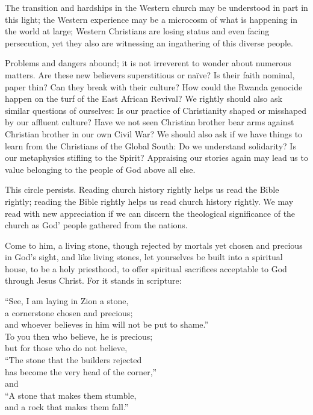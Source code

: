 The transition and hardships in the Western church may be understood in part in this light; the
Western experience may be a microcosm of what is happening in the world at large; Western Christians
are losing status and even facing persecution, yet they also are witnessing an ingathering of this
diverse people.

Problems and dangers abound; it is not irreverent to wonder about numerous matters. Are these new
believers superstitious or naïve? Is their faith nominal, paper thin? Can they break with their
culture? How could the Rwanda genocide happen on the turf of the East African Revival? We rightly
should also ask similar questions of ourselves: Is our practice of Christianity shaped or misshaped
by our affluent culture? Have we not seen Christian brother bear arms against Christian brother in
our own Civil War? We should also ask if we have things to learn from the Christians of the Global
South: Do we understand solidarity? Is our metaphysics stifling to the Spirit? Appraising our
stories again may lead us to value belonging to the people of God above all else.

This circle persists. Reading church history rightly helps us read the Bible rightly; reading the
Bible rightly helps us read church history rightly. We may read with new appreciation if we can
discern the theological significance of the church as God’ people gathered from the nations.

Come to him, a living stone, though rejected by mortals yet chosen and precious in God’s sight, and
like living stones, let yourselves be built into a spiritual house, to be a holy priesthood, to
offer spiritual sacrifices acceptable to God through Jesus Christ. For it stands in scripture:

\begin{poem}
“See, I am laying in Zion a stone,\\
a cornerstone chosen and precious;\\
and whoever believes in him will not be put to shame.”\\
To you then who believe, he is precious;\\
but for those who do not believe,\\
“The stone that the builders rejected\\
has become the very head of the corner,”\\
and\\
“A stone that makes them stumble,\\
and a rock that makes them fall.”
\end{poem}

